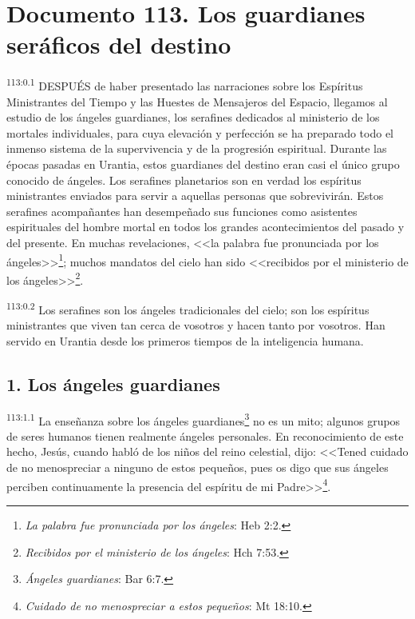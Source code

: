 \chapter{Documento 113. Los guardianes seráficos del destino}
\par
\textsuperscript{113:0.1} DESPUÉS de haber presentado las narraciones sobre los Espíritus Ministrantes del Tiempo y las Huestes de Mensajeros del Espacio, llegamos al estudio de los ángeles guardianes, los serafines dedicados al ministerio de los mortales individuales, para cuya elevación y perfección se ha preparado todo el inmenso sistema de la supervivencia y de la progresión espiritual. Durante las épocas pasadas en Urantia, estos guardianes del destino eran casi el único grupo conocido de ángeles. Los serafines planetarios son en verdad los espíritus ministrantes enviados para servir a aquellas personas que sobrevivirán. Estos serafines acompañantes han desempeñado sus funciones como asistentes espirituales del hombre mortal en todos los grandes acontecimientos del pasado y del presente. En muchas revelaciones, <<la palabra fue pronunciada por los ángeles>>\footnote{\textit{La palabra fue pronunciada por los ángeles}: Heb 2:2.}; muchos mandatos del cielo han sido <<recibidos por el ministerio de los ángeles>>\footnote{\textit{Recibidos por el ministerio de los ángeles}: Hch 7:53.}.

\par
\textsuperscript{113:0.2} Los serafines son los ángeles tradicionales del cielo; son los espíritus ministrantes que viven tan cerca de vosotros y hacen tanto por vosotros. Han servido en Urantia desde los primeros tiempos de la inteligencia humana.

\section*{1. Los ángeles guardianes}
\par
\textsuperscript{113:1.1} La enseñanza sobre los ángeles guardianes\footnote{\textit{Ángeles guardianes}: Bar 6:7.} no es un mito; algunos grupos de seres humanos tienen realmente ángeles personales. En reconocimiento de este hecho, Jesús, cuando habló de los niños del reino celestial, dijo: <<Tened cuidado de no menospreciar a ninguno de estos pequeños, pues os digo que sus ángeles perciben continuamente la presencia del espíritu de mi Padre>>\footnote{\textit{Cuidado de no menospreciar a estos pequeños}: Mt 18:10.}.

